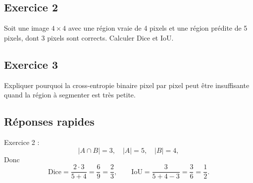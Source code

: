 \documentclass[11pt]{article}
\begin{document}
\subsection*{Exercice 2}
Soit une image $4\times 4$ avec une région vraie de 4 pixels et une région prédite de 5 pixels, dont 3 pixels sont corrects. Calculer Dice et IoU.

\subsection*{Exercice 3}
Expliquer pourquoi la cross-entropie binaire pixel par pixel peut être insuffisante quand la région à segmenter est très petite.

\subsection*{Réponses rapides}
Exercice 2 :
\[
|A\cap B|=3,\quad |A|=5,\quad |B|=4,
\]
Donc
\[
\mathrm{Dice}=\frac{2\cdot 3}{5+4}=\frac{6}{9}=\frac23,
\qquad
\mathrm{IoU}=\frac{3}{5+4-3}=\frac{3}{6}=\frac12.
\]
\end{document}
